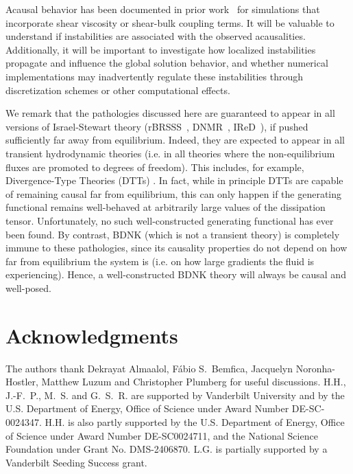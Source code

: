 \documentclass[aps, prd, showkeys,superscriptaddress, nofootinbib,floatfix]{revtex4-2}
\begin{document}
Acausal behavior has been documented in prior work~\cite{Plumberg:2021bme,Chiu:2021muk,ExTrEMe:2023nhy,Domingues:2024pom} for simulations that incorporate shear viscosity or shear-bulk coupling terms. It will be valuable to understand if instabilities are associated with the observed acausalities. Additionally, it will be important to investigate how localized instabilities propagate and influence the global solution behavior, and whether numerical implementations may inadvertently regulate these instabilities through discretization schemes or other computational effects.

We remark that the pathologies discussed here are guaranteed to appear in all versions of Israel-Stewart theory (rBRSSS~\cite{Baier:2007ix},  DNMR~\cite{Denicol:2012cn}, IReD~\cite{Wagner:2022ayd}), if pushed sufficiently far away from equilibrium. Indeed, they are expected to appear in all transient hydrodynamic theories (i.e. in all theories where the non-equilibrium fluxes are promoted to degrees of freedom). This includes, for example, Divergence-Type Theories (DTTs) \cite{GerochDivergence}. In fact, while in principle DTTs are capable of remaining causal far from equilibrium, this can only happen if the generating functional remains well-behaved at arbitrarily large values of the dissipation tensor. Unfortunately, no such well-constructed generating functional has ever been found.
By contrast, BDNK \cite{Bemfica:2017wps, Bemfica:2019knx, Bemfica:2020zjp, Kovtun:2019hdm} (which is not a transient theory) is completely immune to these pathologies, since its causality properties do not depend on how far from equilibrium the system is (i.e. on how large gradients the fluid is experiencing). Hence, a well-constructed BDNK theory will always be causal and well-posed. 


\section*{Acknowledgments}


The authors thank Dekrayat Almaalol, Fábio S.~Bemfica, Jacquelyn Noronha-Hostler, Matthew Luzum and Christopher Plumberg for useful discussions. H.H., J.-F.~P., M.~S. and G.~S.~R. are supported by Vanderbilt University and by the U.S. Department of Energy, Office of Science under Award Number DE-SC-0024347.
H.H. is also partly supported by the U.S. Department of Energy, Office of Science under Award Number DE-SC0024711, and the National Science Foundation under Grant No. DMS-2406870. L.G. is partially supported by a Vanderbilt Seeding Success grant. 
\end{document}
